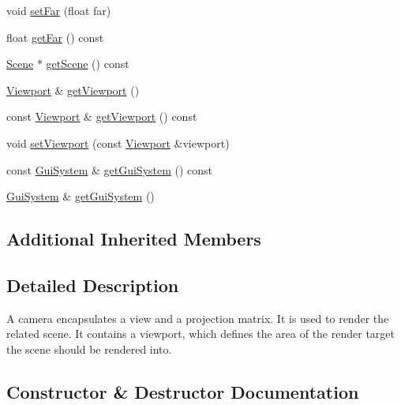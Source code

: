 \begin{DoxyCompactItemize}
void \mbox{\hyperlink{classec_1_1_camera_abdc800333490ec4f890559951340bd08}{set\+Far}} (float far)
\item 
float \mbox{\hyperlink{classec_1_1_camera_a6555d47e1c17caf67cf8683b4cbaca4b}{get\+Far}} () const
\item 
\mbox{\hyperlink{classec_1_1_scene}{Scene}} $\ast$ \mbox{\hyperlink{classec_1_1_camera_a33ad8a16eff39b34db86c6dbf2bbabe4}{get\+Scene}} () const
\item 
\mbox{\hyperlink{classec_1_1_viewport}{Viewport}} \& \mbox{\hyperlink{classec_1_1_camera_a1f2f4a745112c095d17480959a70eb16}{get\+Viewport}} ()
\item 
const \mbox{\hyperlink{classec_1_1_viewport}{Viewport}} \& \mbox{\hyperlink{classec_1_1_camera_adb2920a7a634aadcaca579eaf3fc1ad0}{get\+Viewport}} () const
\item 
void \mbox{\hyperlink{classec_1_1_camera_a3fc6f03041f6c0ee897c9596039d424d}{set\+Viewport}} (const \mbox{\hyperlink{classec_1_1_viewport}{Viewport}} \&viewport)
\item 
const \mbox{\hyperlink{classec_1_1_gui_system}{Gui\+System}} \& \mbox{\hyperlink{classec_1_1_camera_a96f6414127f336eb9079ad30df80d1a7}{get\+Gui\+System}} () const
\item 
\mbox{\hyperlink{classec_1_1_gui_system}{Gui\+System}} \& \mbox{\hyperlink{classec_1_1_camera_a3af91683c492e0094127f169a4927945}{get\+Gui\+System}} ()
\end{DoxyCompactItemize}
\subsection*{Additional Inherited Members}


\subsection{Detailed Description}
A camera encapsulates a view and a projection matrix. It is used to render the related scene. It contains a viewport, which defines the area of the render target the scene should be rendered into. 

\subsection{Constructor \& Destructor Documentation}
\mbox{\label{classec_1_1_camera_a5b8034c32e082171bdb61033781cdcc3}} 
